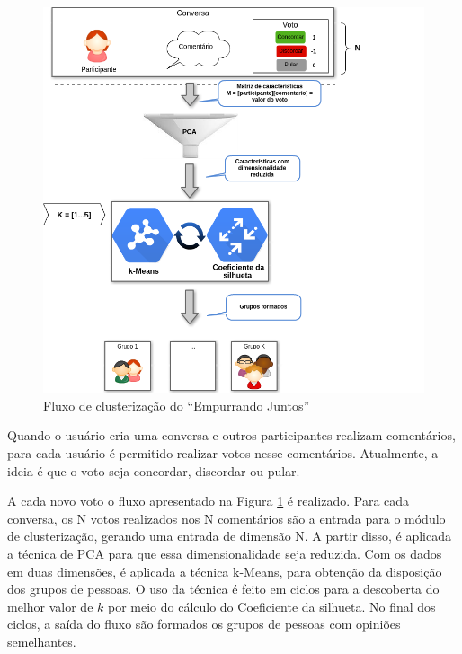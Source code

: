 \begin{apendicesenv}
\begin{figure}[h!]
\centering
\includegraphics[scale=0.7]{figuras/resumo_clusterizao_ej.png}
\caption{Fluxo de clusterização do ``Empurrando Juntos''}
\label{fig:resumo_clusterizao_ej}
\end{figure}

Quando o usuário cria uma conversa e outros participantes realizam comentários, para cada usuário é permitido realizar votos nesse comentários.
Atualmente, a ideia é que o voto seja concordar, discordar ou pular. 

\vfill 
\pagebreak
A cada novo voto o fluxo apresentado na Figura \ref{fig:resumo_clusterizao_ej} é
realizado. Para cada conversa, os N votos realizados nos N comentários são a entrada para o módulo de clusterização, 
gerando uma entrada de dimensão N. A partir disso, é aplicada a técnica de PCA para que
essa dimensionalidade seja reduzida. Com os dados em duas dimensões, é aplicada
a técnica k-Means, para obtenção da disposição dos grupos de pessoas. O uso da técnica é
feito em ciclos para a descoberta do melhor valor de $k$ por meio do cálculo do Coeficiente da silhueta.
No final dos ciclos, a saída do fluxo são formados os grupos de pessoas com opiniões semelhantes.
% 

\end{apendicesenv}
